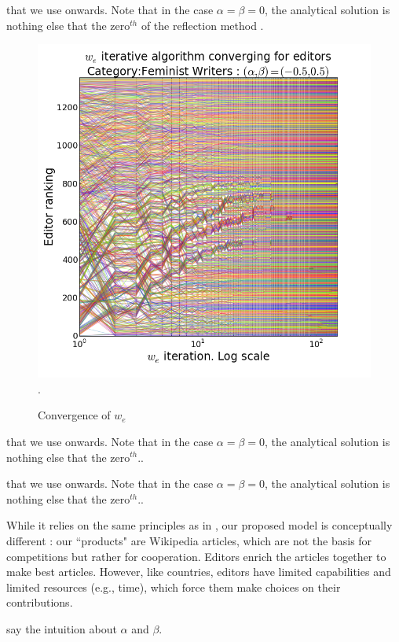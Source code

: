 that we use onwards. Note that in the case $\alpha = \beta = 0$, the analytical solution is nothing else that the zero$^{th}$ of the reflection method \cite{}.

\begin{figure}[!t]
\centering
\includegraphics[width=0.9\columnwidth]{Figures/fem_editors_iter_converge.png}.
\caption{Convergence of $w_e$}
\label{fig:convergence}
\end{figure}

that we use onwards. Note that in the case $\alpha = \beta = 0$, the analytical solution is nothing else that the zero$^{th}$..





that we use onwards. Note that in the case $\alpha = \beta = 0$, the analytical solution is nothing else that the zero$^{th}$..

While it relies on the same principles as in \cite{caldarelli2012network}, our proposed model is conceptually different : our ``products" are Wikipedia articles, which are not the basis for competitions but rather for cooperation. Editors enrich the articles together to make best articles. However, like countries, editors have limited capabilities and limited resources (e.g., time), which force them make choices on their contributions.


say the intuition about $\alpha$ and $\beta$.


